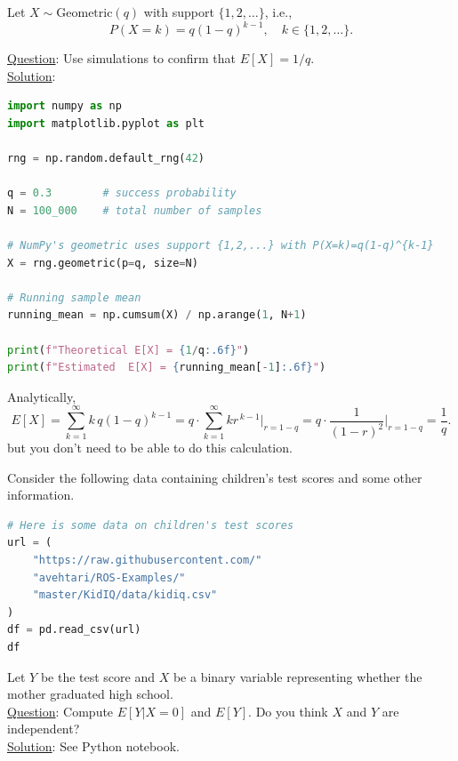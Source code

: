 \begin{example}
Let $X \sim \mathrm{Geometric}(q)$ with support $\{1,2,\dots\}$, i.e.,
\[
P(X=k) = q(1-q)^{k-1},\quad k\in\{1,2,\dots\}.
\]

\noindent
\underline{Question}: Use simulations to confirm that $E[X] = 1/q$.\\

\noindent
\underline{Solution}: 

\begin{lstlisting}[language=Python]
import numpy as np
import matplotlib.pyplot as plt

rng = np.random.default_rng(42)

q = 0.3        # success probability
N = 100_000    # total number of samples

# NumPy's geometric uses support {1,2,...} with P(X=k)=q(1-q)^{k-1}
X = rng.geometric(p=q, size=N)

# Running sample mean
running_mean = np.cumsum(X) / np.arange(1, N+1)

print(f"Theoretical E[X] = {1/q:.6f}")
print(f"Estimated  E[X] = {running_mean[-1]:.6f}")
\end{lstlisting}

Analytically,
\[
E[X] = \sum_{k=1}^\infty k\,q(1-q)^{k-1}
= q \cdot \sum_{k=1}^\infty k r^{\,k-1}\Big|_{r=1-q}
= q \cdot \frac{1}{(1-r)^2}\Big|_{r=1-q}
= \frac{1}{q}.
\]
but you don't need to be able to do this calculation. 


\end{example}

\begin{example}
Consider the following data containing children's test scores and some other information. 
\begin{lstlisting}[language=Python]
# Here is some data on children's test scores
url = (
    "https://raw.githubusercontent.com/"
    "avehtari/ROS-Examples/"
    "master/KidIQ/data/kidiq.csv"
)
df = pd.read_csv(url)
df
\end{lstlisting}

Let $Y$ be the test score and $X$ be a binary variable representing whether the mother graduated high school.\\


\noindent
\underline{Question}: Compute $E[Y|X=0]$ and $E[Y]$. Do you think $X$ and $Y$ are independent? \\

\noindent
\underline{Solution}: See Python notebook.



\end{example}




